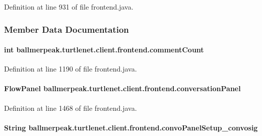 Definition at line 931 of file frontend.\-java.



\subsubsection{Member Data Documentation}
\hypertarget{classballmerpeak_1_1turtlenet_1_1client_1_1frontend_acabb927a2716d2523f33d8055a608a7c}{
\paragraph[{comment\-Count}]{\setlength{\rightskip}{0pt plus 5cm}int ballmerpeak.\-turtlenet.\-client.\-frontend.\-comment\-Count\hspace{0.3cm}{\ttfamily [private]}}}\label{classballmerpeak_1_1turtlenet_1_1client_1_1frontend_acabb927a2716d2523f33d8055a608a7c}


Definition at line 1190 of file frontend.\-java.

\hypertarget{classballmerpeak_1_1turtlenet_1_1client_1_1frontend_a98647f4c02d7c216346e1b4dd3ca499d}{
\paragraph[{conversation\-Panel}]{\setlength{\rightskip}{0pt plus 5cm}Flow\-Panel ballmerpeak.\-turtlenet.\-client.\-frontend.\-conversation\-Panel\hspace{0.3cm}{\ttfamily [private]}}}\label{classballmerpeak_1_1turtlenet_1_1client_1_1frontend_a98647f4c02d7c216346e1b4dd3ca499d}


Definition at line 1468 of file frontend.\-java.

\hypertarget{classballmerpeak_1_1turtlenet_1_1client_1_1frontend_a0fec8e94df0b2bcc31292da80030c92f}{
\paragraph[{convo\-Panel\-Setup\-\_\-convosig}]{\setlength{\rightskip}{0pt plus 5cm}String ballmerpeak.\-turtlenet.\-client.\-frontend.\-convo\-Panel\-Setup\-\_\-convosig\hspace{0.3cm}{\ttfamily [private]}}}\label{classballmerpeak_1_1turtlenet_1_1client_1_1frontend_a0fec8e94df0b2bcc31292da80030c92f}


